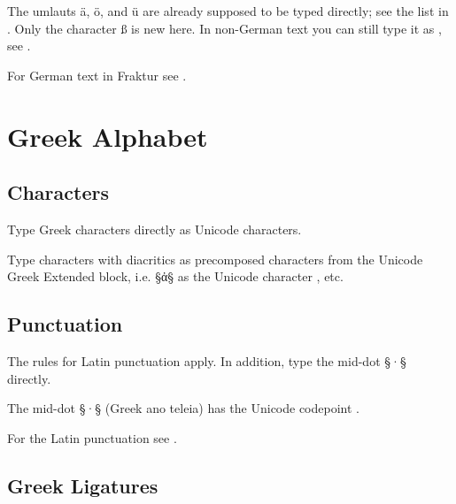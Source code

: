 \begin{note}
The umlauts ä, ö, and ü are already supposed to be typed directly; see the list in . Only the character ß is new here. In non-German text you can still type it as , see .
\end{note}

\begin{crossref}
For German text in Fraktur see .
\end{crossref}


\section{Greek Alphabet}

\tocspace
\subsection{Characters}

\begin{mainrule}
Type Greek characters directly as Unicode characters.
\end{mainrule}

\begin{clarification}
Type characters with diacritics as precomposed characters from the Unicode Greek Extended block, i.e. §ἀ§ as the Unicode character , etc.
\end{clarification}


\tocspace
\subsection{Punctuation}
\label{section greek punctuation}

\begin{mainrule}
The rules for Latin punctuation apply. In addition, type the mid-dot §·§ directly.
\end{mainrule}

\begin{clarification}
The mid-dot §·§ (Greek ano teleia) has the Unicode codepoint .
\end{clarification}

\begin{crossref}
For the Latin punctuation see .
\end{crossref}


\tocspace
\subsection{Greek Ligatures}
\label{section greek ligatures}

